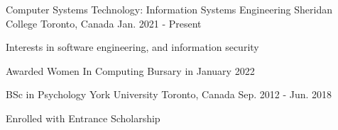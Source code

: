 \begin{cventries}
  \cventry
    {Computer Systems Technology: Information Systems Engineering}
    {Sheridan College}
    {Toronto, Canada}
    {Jan. 2021 - Present}
    {
      \begin{cvitems}
        \item {Interests in software engineering, and information security}
        \item {Awarded Women In Computing Bursary in January 2022}
      \end{cvitems}
    }
    \cventry
    {BSc in Psychology}
    {York University}
    {Toronto, Canada}
    {Sep. 2012 - Jun. 2018}
    {
      \begin{cvitems}
        \item {Enrolled with Entrance Scholarship}
      \end{cvitems}
    }
\end{cventries}
